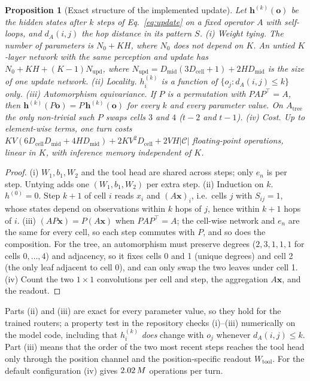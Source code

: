 \documentclass[10pt,twocolumn,letterpaper]{article}
\newtheorem{proposition}{Proposition}
\begin{document}
\begin{proposition}[Exact structure of the implemented update]\label{prop:structure}
Let $\mathbf h^{(k)}(\mathbf o)$ be the hidden states after $k$ steps of Eq.~\eqref{eq:update} on a fixed operator $A$ with self-loops, and $d_A(i,j)$ the hop distance in its pattern $S$.
(i) \emph{Weight tying.} The number of parameters is $N_0 + KH$, where $N_0$ does not depend on $K$. An untied $K$-layer network with the same perception and update has $N_0 + KH + (K{-}1)N_{\text{upd}}$, where $N_{\text{upd}} = D_{\text{mid}}(3D_{\text{cell}}+1) + 2H D_{\text{mid}}$ is the size of one update network.
(ii) \emph{Locality.} $h_i^{(k)}$ is a function of $\{o_j : d_A(i,j)\le k\}$ only.
(iii) \emph{Automorphism equivariance.} If $P$ is a permutation with $PAP^{\top}=A$, then $\mathbf h^{(k)}(P\mathbf o) = P\,\mathbf h^{(k)}(\mathbf o)$ for every $k$ and every parameter value. On $A_{\text{tree}}$ the only non-trivial such $P$ swaps cells $3$ and $4$ ($t{-}2$ and $t{-}1$).
(iv) \emph{Cost.} Up to element-wise terms, one turn costs $K V (6D_{\text{cell}}D_{\text{mid}} + 4HD_{\text{mid}}) + 2KV^2 D_{\text{cell}} + 2VH|\mathcal C|$ floating-point operations, linear in $K$, with inference memory independent of $K$.
\end{proposition}
\begin{proof}
(i) $W_1,b_1,W_2$ and the tool head are shared across steps; only $e_n$ is per step. Untying adds one $(W_1,b_1,W_2)$ per extra step. (ii) Induction on $k$. $h^{(0)}=0$. Step $k{+}1$ of cell $i$ reads $x_i$ and $(A\mathbf x)_i$, i.e.\ cells $j$ with $S_{ij}=1$, whose states depend on observations within $k$ hops of $j$, hence within $k{+}1$ hops of $i$. (iii) $(A P\mathbf x) = P(A\mathbf x)$ when $PAP^{\top}=A$; the cell-wise network and $e_n$ are the same for every cell, so each step commutes with $P$, and so does the composition. For the tree, an automorphism must preserve degrees ($2,3,1,1,1$ for cells $0,\dots,4$) and adjacency, so it fixes cells 0 and 1 (unique degrees) and cell 2 (the only leaf adjacent to cell 0), and can only swap the two leaves under cell 1. (iv) Count the two $1\times1$ convolutions per cell and step, the aggregation $A\mathbf x$, and the readout.
\end{proof}
Parts (ii) and (iii) are exact for every parameter value, so they hold for the trained routers; a property test in the repository checks (i)--(iii) numerically on the model code, including that $h_i^{(k)}$ \emph{does} change with $o_j$ whenever $d_A(i,j)\le k$. Part (iii) means that the order of the two most recent steps reaches the tool head only through the position channel and the position-specific readout $W_{\text{tool}}$. For the default configuration (iv) gives $2.02\,M$ operations per turn.
\end{document}
